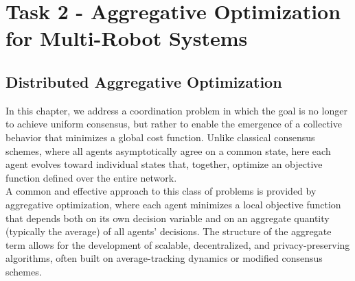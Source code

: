 \chapter{Task 2 - Aggregative Optimization for Multi-Robot Systems}
\label{ch:aggregative}
\section{Distributed Aggregative Optimization}
\label{sec:dist_aggr}

In this chapter, we address a coordination problem in which the goal is no longer to achieve uniform consensus, but rather to enable the emergence of a collective behavior that minimizes a global cost function. Unlike classical consensus schemes, where all agents asymptotically agree on a common state, here each agent evolves toward individual states that, together, optimize an objective function defined over the entire network. \\
A common and effective approach to this class of problems is provided by aggregative optimization, where each agent minimizes a local objective function that depends both on its own decision variable and on an aggregate quantity (typically the average) of all agents' decisions. The structure of the aggregate term allows for the development of scalable, decentralized, and privacy-preserving algorithms, often built on average-tracking dynamics or modified consensus schemes.

\medskip

